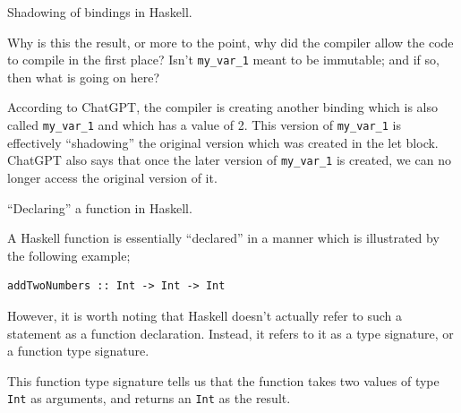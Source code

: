 \begin{frame}[t, fragile]{Shadowing of bindings in Haskell.}

Why is this the result, or more to the point, why did the compiler allow the code to compile in the first place? Isn't
\texttt{my_var_1} meant to be immutable; and if so, then what is going on here?

According to ChatGPT, the compiler is creating another binding which is also called \texttt{my_var_1} and which has a value
of 2. This version of \texttt{my_var_1} is effectively ``shadowing'' the original version which was created in the let block.
ChatGPT also says that once the later version of \texttt{my_var_1} is created, we can no longer access the original version of it.
\end{frame}

\begin{frame}[t, fragile]{``Declaring'' a function in Haskell.}

A Haskell function is essentially ``declared'' in a manner which is
illustrated by the following example;

\begin{verbatim}
addTwoNumbers :: Int -> Int -> Int
\end{verbatim}

However, it is worth noting that Haskell doesn't actually refer to such a statement
as a function declaration. Instead, it refers to it as a type signature,
or a function type signature.

This function type signature tells us that the function takes two values
of type \texttt{Int}
as arguments, and returns an \texttt{Int} as the result.

\end{frame}
